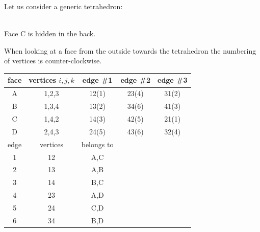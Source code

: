 Let us consider a generic tetrahedron:
\begin{center}
\\
{\captionfont Face C is hidden in the back.}
\end{center}


When looking at a face from the outside towards the tetrahedron the numbering 
of vertices is counter-clockwise.
\begin{center}
\begin{tabular}{ccccc}
\hline
face & vertices $i,j,k$ & edge \#1 & edge \#2 & edge \#3 \\
\hline\hline
A& 1,2,3  & 12({\color{purple}1}) & 23({\color{purple}4}) & 31({\color{purple}2}) \\
B& 1,3,4  & 13({\color{purple}2}) & 34({\color{purple}6}) & 41({\color{purple}3}) \\
C& 1,4,2  & 14({\color{purple}3}) & 42({\color{purple}5}) & 21({\color{purple}1}) \\
D& 2,4,3  & 24({\color{purple}5}) & 43({\color{purple}6}) & 32({\color{purple}4}) \\
\hline
edge & vertices & belongs to \\
{\color{purple}1} & 12 & A,C\\
{\color{purple}2} & 13 & A,B\\
{\color{purple}3} & 14 & B,C\\
{\color{purple}4} & 23 & A,D\\
{\color{purple}5} & 24 & C,D\\
{\color{purple}6} & 34 & B,D\\
\hline
\end{tabular}
\end{center}


